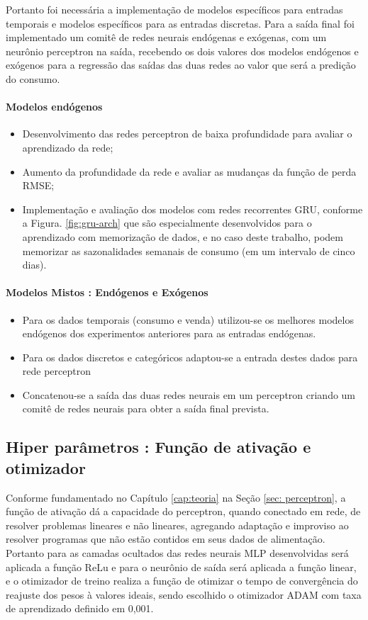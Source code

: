                 Portanto foi necessária a implementação de modelos específicos para entradas temporais e modelos específicos para as entradas discretas.
                Para a saída final foi implementado um comitê de redes neurais endógenas e exógenas, com um neurônio perceptron na saída, recebendo os dois valores dos modelos endógenos e exógenos para a regressão das saídas das duas redes ao valor que será a predição do consumo.
         	\paragraph{Modelos endógenos}
         	\begin{itemize}
                \item	Desenvolvimento das redes perceptron de baixa profundidade para avaliar o aprendizado da rede;
                \item	Aumento da profundidade da rede e avaliar as mudanças da função de perda RMSE; 
                \item	Implementação e avaliação dos modelos com redes recorrentes GRU, conforme a Figura. \ref{fig:gru-arch} que são especialmente desenvolvidos para o aprendizado com memorização de dados, e no caso deste trabalho, podem memorizar as sazonalidades semanais de consumo (em um intervalo de cinco dias).
            \end{itemize}
            \paragraph{Modelos Mistos : Endógenos e Exógenos}
                \begin{itemize}
                    \item Para os dados temporais (consumo e venda) utilizou-se os melhores modelos endógenos dos experimentos anteriores para as entradas endógenas. 
                    \item Para os dados discretos e categóricos adaptou-se a entrada destes dados para rede perceptron
                    \item  Concatenou-se a saída das duas redes neurais em um perceptron criando um comitê de redes neurais para obter a saída final prevista.
                \end{itemize}
            
	\subsection{Hiper parâmetros : Função de ativação e otimizador}
        Conforme fundamentado no Capítulo \ref{cap:teoria} na Seção \ref{sec: perceptron}, a função de ativação dá a capacidade do perceptron, quando conectado em rede, de resolver problemas lineares e não lineares, agregando adaptação e improviso ao resolver programas que não estão contidos em seus dados de alimentação.
        Portanto para as camadas ocultados das redes neurais MLP desenvolvidas será aplicada a função ReLu e para o neurônio de saída será aplicada a função linear, e o otimizador de treino realiza a função de otimizar o tempo de convergência do reajuste dos pesos à valores ideais, sendo escolhido o otimizador ADAM com taxa de aprendizado definido em 0,001.

